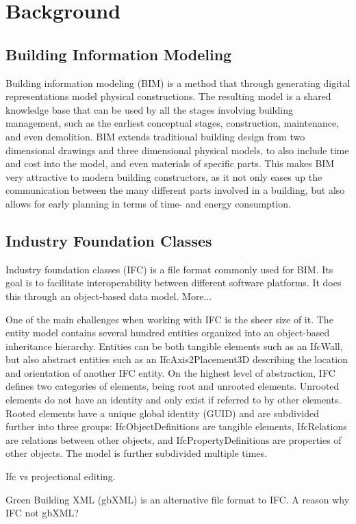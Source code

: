 \section{Background}
\subsection{Building Information Modeling}
Building information modeling (BIM) is a method that through generating digital representations model physical constructions. The resulting model is a shared knowledge base that can be used by all the stages involving building management, such as the earliest conceptual stages, construction, maintenance, and even demolition. BIM extends traditional building design from two dimensional drawings and three dimensional physical models, to also include time and cost into the model, and even materials of specific parts. This makes BIM very attractive to modern building constructors, as it not only eases up the communication between the many different parts involved in a building, but also allows for early planning in terms of time- and energy consumption.
\subsection{Industry Foundation Classes}
Industry foundation classes (IFC) is a file format commonly used for BIM. Its goal is to facilitate interoperability between different software platforms. It does this through an object-based data model. More...

One of the main challenges when working with IFC is the sheer size of it. The entity model contains several hundred entities organized into an object-based inheritance hierarchy. Entities can be both tangible elements such as an IfcWall, but also abstract entities such as an IfcAxis2Placement3D describing the location and orientation of another IFC entity. On the highest level of abstraction, IFC defines two categories of elements, being root and unrooted elements. Unrooted elements do not have an identity and only exist if referred to by other elements. Rooted elements have a unique global identity (GUID) and are subdivided further into three groups: IfcObjectDefinitions are tangible elements, IfcRelations are relations between other objects, and IfcPropertyDefinitions are properties of other objects. The model is further subdivided multiple times. 

Ifc vs projectional editing.

Green Building XML (gbXML) is an alternative file format to IFC. A reason why IFC not gbXML?
